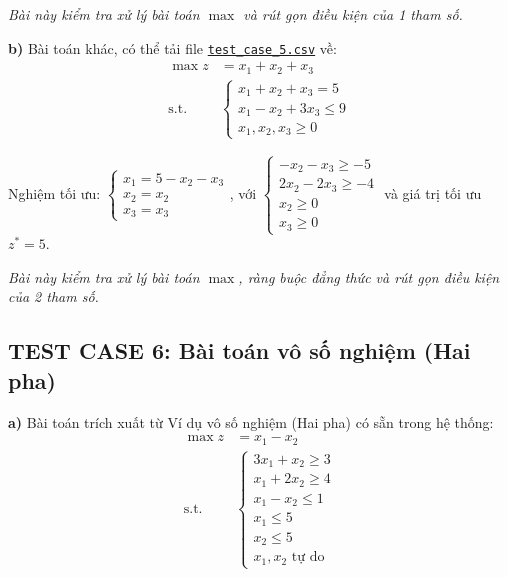 \documentclass[12pt,a4paper]{article}
\begin{document}
\textit{Bài này kiểm tra xử lý bài toán $\max$ và rút gọn điều kiện của 1 tham số.}

\noindent \textbf{b)} Bài toán khác, có thể tải file \href{https://drive.google.com/uc?export=download&id=1cSyDA359zQ8juj1aTRf-39mNglCkZVTj}{\texttt{test\_case\_5.csv}} về:
\begin{equation*}
    \begin{aligned}
        \max z &= x_1 + x_2 + x_3 \\
        \text{s.t.} \quad
        &\begin{cases}
            x_1 + x_2 + x_3 = 5 \\
            x_1 - x_2 + 3x_3 \leq 9 \\
            x_1, x_2, x_3 \geq 0
        \end{cases}
    \end{aligned}
\end{equation*}

Nghiệm tối ưu: $\begin{cases}
    x_1 = 5 - x_2 - x_3\\
    x_2 = x_2 \\
    x_3 = x_3
\end{cases}$, với $\begin{cases}
    - x_2 - x_3 \geq -5 \\
    2x_2 - 2x_3 \geq -4 \\
    x_2 \geq 0 \\
    x_3 \geq 0
\end{cases}$ và giá trị tối ưu $z^* = 5$.

\textit{Bài này kiểm tra xử lý bài toán $\max$, ràng buộc đẳng thức và rút gọn điều kiện của 2 tham số.}

\subsection*{TEST CASE 6: Bài toán vô số nghiệm (Hai pha)}

\noindent \textbf{a)} Bài toán trích xuất từ \colorbox{green!30}{Ví dụ vô số nghiệm (Hai pha)} có sẵn trong hệ thống:
\begin{equation*}
    \begin{aligned}
        \max z &= x_1 - x_2 \\
        \text{s.t.} \quad
        &\begin{cases}
            3x_1 + x_2 \geq 3 \\
            x_1 + 2x_2 \geq 4 \\
            x_1 - x_2 \leq 1 \\
            x_1 \leq 5 \\
            x_2 \leq 5 \\
            x_1, x_2 \text{ tự do}
        \end{cases}
    \end{aligned}
\end{equation*}
\end{document}
